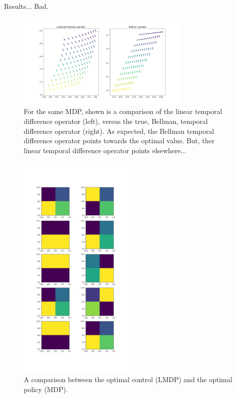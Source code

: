 Results... Bad.

\begin{figure}
\centering
\includegraphics[width=0.75\textwidth,height=0.5\textheight]{../../pictures/figures/LBO_BO.png}
\caption{For the same MDP, shown is a comparison of the linear temporal difference operator (left), versus the true, Bellman, temporal difference operator (right). As expected, the Bellman temporal difference operator points towards the optimal value. But, ther linear temporal difference operator points elsewhere...}
\end{figure}

\begin{figure}
\centering
\includegraphics[width=0.5\textwidth,height=0.75\textheight]{../../pictures/figures/lmdp_mdp_optimal_dynamics.png}
\caption{A comparison between the optimal control (LMDP) and the optimal policy (MDP).}
\end{figure}

